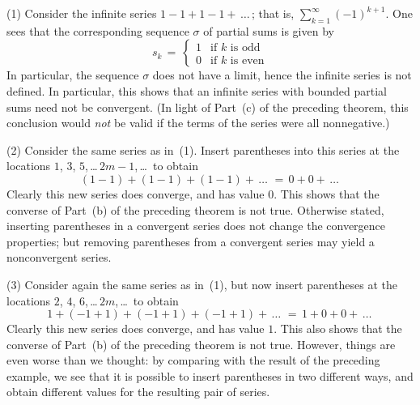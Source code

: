 \hspace*{\parindent}(1) Consider the infinite series $1-1+1-1+\,{\ldots}\,$; that is, $\sum_{k=1}^{{\infty}} (-1)^{k+1}$.
    One sees that the corresponding sequence ${\sigma}$ of partial sums is given by
        \begin{displaymath}
        s_{k} \,=\, \left\{
        \begin{array}{rl}
        1 & \mbox{if $k$ is odd} \\
        0 & \mbox{if $k$ is even}
        \end{array}
                                \right.
        \end{displaymath}
    In particular, the sequence ${\sigma}$ does not have a limit, hence the infinite series is not defined.
    In particular, this shows that an infinite series with bounded partial sums need not be convergent.
    (In light of Part~(c) of the preceding theorem, this conclusion would {\em not} be valid if the terms of the series were all nonnegative.)

\V

        (2) Consider the same series as in~(1). Insert parentheses into this series at the locations $1$, $3$, $5$,\,{\ldots}\,$2m-1$,\,{\ldots}\, to obtain
        \begin{displaymath}
        (1-1) + (1-1) + (1-1) +\,{\ldots}\, \,=\, 0+0+\,{\ldots}\,
        \end{displaymath}
    Clearly this new series does converge, and has value $0$.
    This shows that the converse of Part~(b) of the preceding theorem is not true.
    Otherwise stated, inserting parentheses in a convergent series does not change the convergence properties;
    but removing parentheses from a convergent series may yield a nonconvergent series.

\V

        (3) Consider again the same series as in~(1), but now insert parentheses at the locations $2$, $4$, $6$,\,{\ldots}\,$2m$,\,{\ldots}\, to obtain
        \begin{displaymath}
        1+(-1 + 1) + (-1+1) + (-1+1) +\,{\ldots}\, \,=\, 1+ 0+0+\,{\ldots}\,
        \end{displaymath}
    Clearly this new series does converge, and has value $1$.
    This also shows that the converse of Part~(b) of the preceding theorem is not true.
    However, things are even worse than we thought: by comparing with the result of the preceding example,
    we see that it is possible to insert parentheses in two different ways, and obtain different values for the resulting pair of series.

